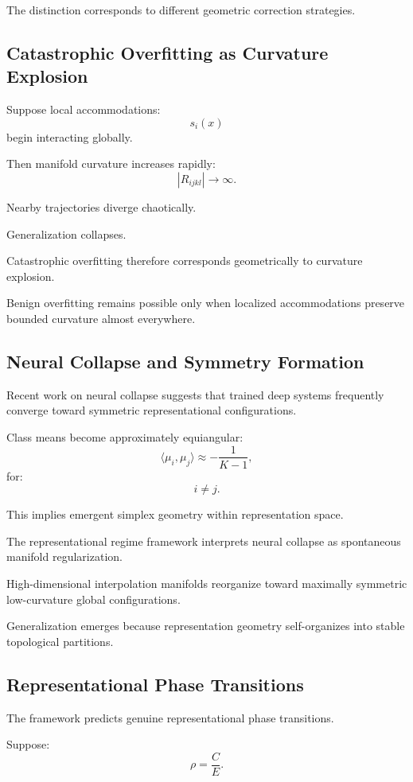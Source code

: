 \documentclass[12pt,a4paper]{article}
\begin{document}
The distinction corresponds to different geometric correction strategies.

\subsection{Catastrophic Overfitting as Curvature Explosion}

Suppose local accommodations:
\[
s_i(x)
\]
begin interacting globally.

Then manifold curvature increases rapidly:
\[
|R_{ijkl}|
\rightarrow
\infty.
\]

Nearby trajectories diverge chaotically.

Generalization collapses.

Catastrophic overfitting therefore corresponds geometrically to curvature explosion.

Benign overfitting remains possible only when localized accommodations preserve bounded curvature almost everywhere.

\subsection{Neural Collapse and Symmetry Formation}

Recent work on neural collapse suggests that trained deep systems frequently converge toward symmetric representational configurations.

Class means become approximately equiangular:
\[
\langle \mu_i,\mu_j\rangle
\approx
-\frac{1}{K-1},
\]
for:
\[
i\neq j.
\]

This implies emergent simplex geometry within representation space.

The representational regime framework interprets neural collapse as spontaneous manifold regularization.

High-dimensional interpolation manifolds reorganize toward maximally symmetric low-curvature global configurations.

Generalization emerges because representation geometry self-organizes into stable topological partitions.

\subsection{Representational Phase Transitions}

The framework predicts genuine representational phase transitions.

Suppose:
\[
\rho
=
\frac{C}{E}.
\]
\end{document}
